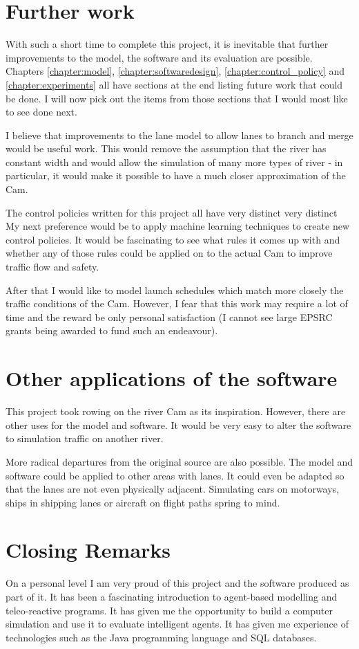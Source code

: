   \section{Further work}
  With such a short time to complete this project, it is inevitable that further improvements to the model, the software and its evaluation are possible. Chapters \ref{chapter:model}, \ref{chapter:softwaredesign}, \ref{chapter:control_policy} and \ref{chapter:experiments} all have sections at the end listing future work that could be done. I will now pick out the items from those sections that I would most like to see done next.
  
  I believe that improvements to the lane model to allow lanes to branch and merge would be useful work. This would remove the assumption that the river has constant width and would allow the simulation of many more types of river - in particular, it would make it possible to have a much closer approximation of the Cam.
  
  The control policies written for this project all have very distinct  very distinct My next preference would be to apply machine learning techniques to create new control policies. It would be fascinating to see what rules it comes up with and whether any of those rules could be applied on to the actual Cam to improve traffic flow and safety.
  
  After that I would like to model launch schedules which match more closely the traffic conditions of the Cam. However, I fear that this work may require a lot of time and the reward be only personal satisfaction (I cannot see large EPSRC grants being awarded to fund such an endeavour).
  
  \section{Other applications of the software}
  This project took rowing on the river Cam as its inspiration. However, there are other uses for the model and software. It would be very easy to alter the software to simulation traffic on another river.
  
  More radical departures from the original source are also possible. The model and software could be applied to other areas with lanes. It could even be adapted so that the lanes are not even physically adjacent. Simulating cars on motorways, ships in shipping lanes or aircraft on flight paths spring to mind.

  \section{Closing Remarks}
  On a personal level I am very proud of this project and the software produced as part of it. It has been a fascinating introduction to agent-based modelling and teleo-reactive programs. It has given me the opportunity to build a computer simulation and use it to evaluate intelligent agents. It has given me experience of technologies such as the Java programming language and SQL databases.
  
